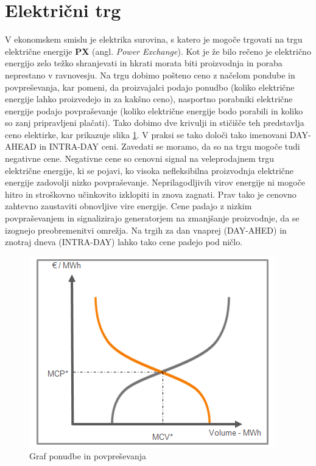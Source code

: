 \documentclass[12pt,a4paper]{amsart}
\theoremstyle{definition} %
\theoremstyle{plain} %
\begin{document}
{\section*{Električni trg}

V ekonomskem smislu je elektrika surovina, s katero je mogoče trgovati na trgu električne energije \textbf{PX} (angl. \textit{Power Exchange}). Kot je že bilo rečeno je električno energijo zelo težko shranjevati in hkrati morata biti proizvodnja in poraba neprestano v ravnovesju.
 Na trgu dobimo pošteno ceno z načelom pondube in povpreševanja, kar pomeni, da proizvajalci podajo ponudbo (koliko električne energije lahko proizvedejo in za kakšno ceno), nasportno porabniki električne energije podajo povpraševanje (koliko električne energije bodo porabili in koliko so zanj pripravljeni plačati). 
Tako dobimo dve krivulji in stičišče teh predstavlja ceno elektirke, kar prikazuje slika \ref{fig:postena_cena}. V praksi se tako določi tako imenovani DAY-AHEAD in INTRA-DAY ceni. Zavedati se moramo, da so na trgu mogoče tudi negativne cene.
 Negativne cene so cenovni signal na veleprodajnem trgu električne energije, ki se pojavi, ko visoka nefleksibilna proizvodnja električne energije zadovolji nizko povpraševanje. Neprilagodljivih virov energije ni mogoče hitro in stroškovno učinkovito izklopiti in znova zagnati. Prav tako je cenovno zahtevno zaustaviti obnovljive vire energije.  
 Cene padajo z nizkim povpraševanjem in signalizirajo generatorjem na zmanjšanje proizvodnje, da se izognejo preobremenitvi omrežja. Na trgih za dan vnaprej (DAY-AHED) in znotraj dneva (INTRA-DAY) lahko tako cene padejo pod ničlo.

\begin{figure}[h]
    \centering
    \includegraphics[scale=0.75]{curve}
    \caption{Graf ponudbe in povpreševanja}
    \label{fig:postena_cena}
\end{figure}

}
\end{document}
